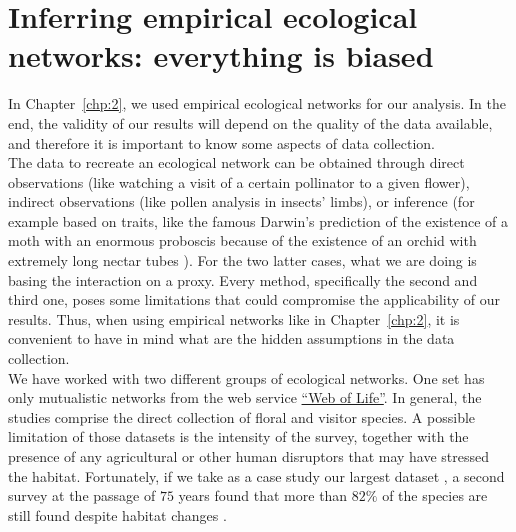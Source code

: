 \chapter{Inferring empirical ecological networks: everything is biased}\label{appen:Inferring}
In Chapter~\ref{chp:2}, we used empirical ecological networks for our analysis. In the end, the validity of our results will depend on the quality of the data available, and therefore it is important to know some aspects of data collection. \\

The data to recreate an ecological network can be obtained through direct observations (like watching a visit of a certain pollinator to a given flower), indirect observations (like pollen analysis in insects' limbs), or inference (for example based on traits, like the famous Darwin's prediction of the existence of a moth with an enormous proboscis because of the existence of an orchid with extremely long  nectar tubes \cite{darwin1877various}). For the two latter cases, what we are doing is basing the interaction on a proxy. Every method, specifically the second and third one, poses some limitations that could compromise the applicability of our results. Thus, when using empirical networks like in Chapter~\ref{chp:2},  it is convenient to have in mind what are the hidden assumptions in the data collection. \\

We have worked with two different groups of ecological networks. One set has only mutualistic networks from the web service  \href{www.web-of-life.es}{``Web of Life''}. In general, the studies comprise the direct collection of floral and visitor species. A possible limitation of those datasets is the intensity of the survey, together with the presence of any agricultural or other human disruptors that may have stressed the habitat. Fortunately, if we take as a case study our largest dataset \cite{robertson1928flowers}, a second survey at the passage of $75$ years found that more than $82\%$ of the species are still found despite habitat changes \cite{marlin2001native}. \\

